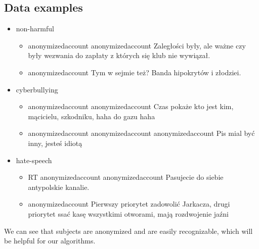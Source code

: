 \documentclass[a4paper]{article}
\begin{document}
\subsection{Data examples}
\begin{itemize}
    \item non-harmful
        \begin{itemize}
            \item anonymizedaccount anonymizedaccount Zaległości były, ale ważne czy były wezwania do zapłaty z których się klub nie wywiązał.
            \item anonymizedaccount Tym w sejmie też? Banda hipokrytów i złodziei.
        \end{itemize}
    \item cyberbullying
        \begin{itemize}
            \item anonymizedaccount anonymizedaccount Czas pokaże kto jest kim, mącicielu, szkodniku, haha do gazu haha
            \item anonymizedaccount anonymizedaccount anonymizedaccount Pis mial być inny, jesteś idiotą
        \end{itemize}
    \item hate-speech
        \begin{itemize}
            \item RT anonymizedaccount anonymizedaccount Pasujecie do siebie antypolskie kanalie.
            \item anonymizedaccount Pierwszy priorytet zadowolić Jarkacza, drugi priorytet ssać kasę wszystkimi otworami,  mają rozdwojenie jaźni
        \end{itemize}
\end{itemize}

We can see that subjects are anonymized and are easily recognizable, which will be helpful for our algorithms.

\newpage
\end{document}
